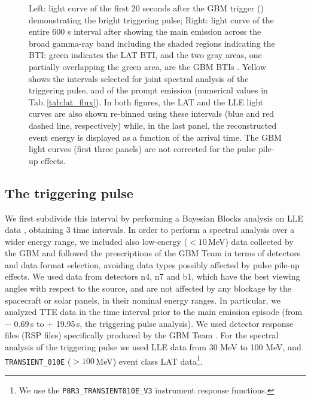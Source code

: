 \documentclass[preprint]{aastex631}
\begin{document}
\begin{figure}[t]
    \caption{Left: light curve of the first 20 seconds after the GBM trigger (\trig) demonstrating the bright triggering pulse; 
    Right: light curve of the entire 600 s interval after \trig showing the main emission across the broad gamma-ray band including the shaded regions indicating the BTI: green indicates the LAT BTI, and the two gray areas, one partially overlapping the green area, are the GBM BTIs \citep{2023ApJ...952L..42L}. Yellow shows the intervals selected for joint spectral analysis of the triggering pulse, and of the prompt emission (numerical values in Tab.\,\ref{tab:lat_flux}). In both figures, the LAT and the LLE light curves are also shown re-binned using these intervals (blue and red dashed line, respectively) while, in the last panel, the reconstructed event energy is displayed as a function of the arrival time. The GBM light curves (first three panels) are not corrected for the pulse pile-up effects.}
    \label{fig:prompt_lc}
\end{figure}

\subsection{The triggering pulse}
\label{sec:precursor}
 We first subdivide this interval by performing a Bayesian Blocks analysis \citep{2013ApJ...764..167S} on LLE data \citep{PelassaLLE,LLESolarFlare}, obtaining 3 time intervals. 
In order to perform a spectral analysis over a wider energy range, we included also low-energy ($<10$\,MeV) data collected by the GBM and followed the prescriptions of the GBM Team \citep{2023ApJ...952L..42L} in terms of detectors and data format selection, avoiding data types possibly affected by pulse pile-up effects. We used data from detectors n4, n7 and b1, which have the best viewing angles with respect to the source, and are not affected by any blockage by the spacecraft or solar panels, in their nominal energy ranges. In particular, we analyzed TTE \citep[Time-Tagged Event,][]{2009arXiv0908.0450M} data in the time interval prior to the main emission episode (from \trig $-$ 0.69\,s to \trig + 19.95\,s, the triggering pulse analysis). We used detector response files (RSP files) specifically produced by the GBM Team   \citep{2023ApJ...952L..42L}.
For the spectral analysis of the triggering pulse we used LLE data from 30 MeV to 100 MeV, and \texttt{TRANSIENT\_010E} ($>100$\,MeV) event class LAT data\footnote{We use the \texttt{P8R3\_TRANSIENT010E\_V3} instrument response functions.}.
\end{document}
